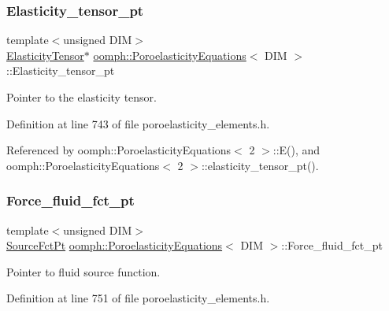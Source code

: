 \subsubsection{\texorpdfstring{Elasticity\+\_\+tensor\+\_\+pt}{Elasticity\_tensor\_pt}}
{\footnotesize\ttfamily template$<$unsigned D\+IM$>$ \\
\hyperlink{classoomph_1_1ElasticityTensor}{Elasticity\+Tensor}$\ast$ \hyperlink{classoomph_1_1PoroelasticityEquations}{oomph\+::\+Poroelasticity\+Equations}$<$ D\+IM $>$\+::Elasticity\+\_\+tensor\+\_\+pt\hspace{0.3cm}{\ttfamily [protected]}}



Pointer to the elasticity tensor. 



Definition at line 743 of file poroelasticity\+\_\+elements.\+h.



Referenced by oomph\+::\+Poroelasticity\+Equations$<$ 2 $>$\+::\+E(), and oomph\+::\+Poroelasticity\+Equations$<$ 2 $>$\+::elasticity\+\_\+tensor\+\_\+pt().

\mbox{\label{classoomph_1_1PoroelasticityEquations_a0eddc37ef5d34554635e3d348fc00b4e}} 
\subsubsection{\texorpdfstring{Force\+\_\+fluid\+\_\+fct\+\_\+pt}{Force\_fluid\_fct\_pt}}
{\footnotesize\ttfamily template$<$unsigned D\+IM$>$ \\
\hyperlink{classoomph_1_1PoroelasticityEquations_a234bc29fbd4c3255ef903a3cb5f6361f}{Source\+Fct\+Pt} \hyperlink{classoomph_1_1PoroelasticityEquations}{oomph\+::\+Poroelasticity\+Equations}$<$ D\+IM $>$\+::Force\+\_\+fluid\+\_\+fct\+\_\+pt\hspace{0.3cm}{\ttfamily [private]}}



Pointer to fluid source function. 



Definition at line 751 of file poroelasticity\+\_\+elements.\+h.



